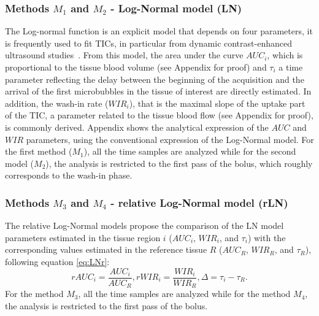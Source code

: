 \subsubsection{Methods $M_1$ and $M_2$ - Log-Normal model (LN)}
The Log-normal function is an explicit model that depends on four parameters, it is frequently used to fit TICs, in particular from dynamic contrast-enhanced ultrasound studies~\cite{Strouthos2010it}.
From this model, the area under the curve $AUC_i$, which is proportional to the tissue blood volume (see Appendix for proof) and $\tau_i$ a time parameter reflecting the delay between the beginning of the acquisition and the arrival of the first microbubbles in the tissue of interest are directly estimated. In addition, the wash-in rate ($WIR_i$), that is the maximal slope of the uptake part of the TIC, a parameter related to the tissue blood flow (see Appendix for proof), is commonly derived. Appendix shows the analytical expression of the $AUC$ and $WIR$ parameters, using the conventional expression of the Log-Normal model.
For the first method ($M_1$), all the time samples are analyzed while for the second model ($M_2$), the analysis is restricted to the first pass of the bolus, which roughly corresponds to the wash-in phase.

\subsubsection{Methods $M_3$ and $M_4$ - relative Log-Normal model (rLN)}
The relative Log-Normal models propose the comparison of the LN model parameters estimated in the tissue region $i$ ($AUC_i$, $WIR_i$, and $\tau_i$) with the corresponding values estimated in the reference tissue $R$ ($AUC_R$, $WIR_R$, and $\tau_R$), following equation \ref{eq:LNr}:
 \begin{equation}
 rAUC_i = \frac {AUC_i} {AUC_R}, rWIR_i = \frac {WIR_i} {WIR_R}, \Delta = \tau_i - \tau_{R}.
 \label{eq:LNr}
\end{equation}
For the method $M_3$, all the time samples are analyzed while for the method $M_4$, the analysis is restricted to the first pass of the bolus.


